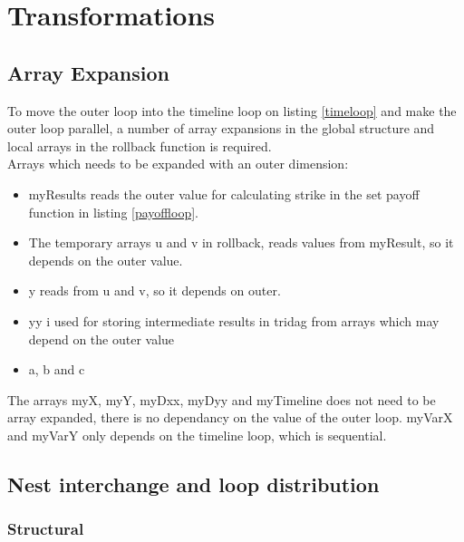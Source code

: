 \section{Transformations}

\subsection{Array Expansion}
\label{sec:arrayexp}
To move the outer loop into the timeline loop on listing \ref{timeloop} and make the outer loop parallel, a number of array expansions in the global structure and local arrays in the rollback function is required.\\
Arrays which needs to be expanded with an outer dimension: 
\begin{itemize}
\item myResults reads the outer value for calculating strike in the set payoff function in listing \ref{payoffloop}.
\item The temporary arrays u and v in rollback, reads values from myResult, so it depends on the outer value. 
\item y reads from u and v, so it depends on outer. 
\item yy i used for storing intermediate results in tridag from arrays which may depend on the outer value 
\item a, b and c    
\end{itemize}

The arrays myX, myY, myDxx, myDyy and myTimeline does not need to be array expanded, there is no dependancy on the value of the outer loop. myVarX and myVarY only depends on the timeline loop, which is sequential.

\subsection{Nest interchange and loop distribution}

\subsubsection{Structural}
